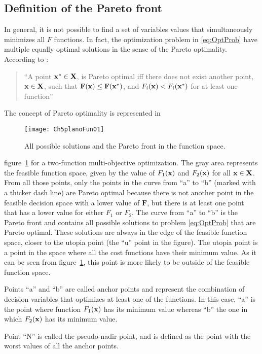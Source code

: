 \subsection{Definition of the Pareto front}
In general, it is not possible to find a set of variables values that simultaneously minimizes all $F$ functions. In fact, the optimization problem in \eqref{eq:OptProb} have multiple equally optimal solutions in the sense of the Pareto optimality. According to \citet{Marler2004}:
\begin{quote}
	``A point $\mathbf{x}^*\in \mathbf{X}$, is Pareto optimal iff there does not exist another point, $\mathbf{x} \in \mathbf{X}$, such that $\mathbf{F}(\mathbf{x})\leq\mathbf{F}(\mathbf{x}^*)$, and $F_i(\mathbf{x})<F_i(\mathbf{x}^*)$ for at least one function''
\end{quote}

The concept of Pareto optimality is represented in %
%
\begin{figure}[tb]
	\centering
	\texttt{[image: Ch5planoFun01]}
	\caption{All possible solutions and the Pareto front in the function space.}
	\label{fig:planoFun01}
\end{figure}
%
figure~\ref{fig:planoFun01} for a two-function multi-objective optimization. The gray area represents the feasible function space, given by the value of $F_1(\mathbf{x})$ and $F_2(\mathbf{x})$ for all $\mathbf{x} \in \mathbf{X}$. From all those points, only the points in the curve from ``a'' to ``b'' (marked with a thicker dash line) are Pareto optimal because there is not another point in the feasible decision space with a lower value of $\mathbf{F}$, but there is at least one point that has a lower value for either $F_1$ or $F_2$. The curve from ``a'' to ``b'' is the Pareto front and contains all possible solutions to problem \eqref{eq:OptProb} that are Pareto optimal. These solutions are always in the edge of the feasible function space, closer to the utopia point (the ``u'' point in the figure). The utopia point is a point in the space where all the cost functions have their minimum value. As it can be seen from figure~\ref{fig:planoFun01}, this point is more likely to be outside of the feasible function space.

Points ``a'' and ``b'' are called anchor points and represent the combination of decision variables that optimizes at least one of the functions. In this case, ``a'' is the point where function $F_1(\mathbf{x})$ has its minimum value whereas ``b'' the one in which $F_2(\mathbf{x})$ has its minimum value.

Point ``N'' is called the pseudo-nadir point, and is defined as the point with the worst values of all the anchor points.

